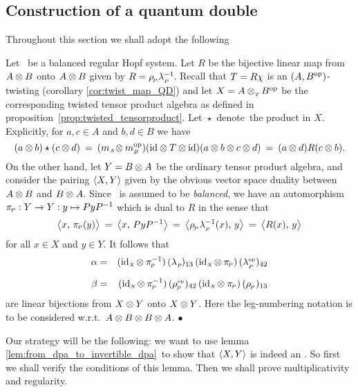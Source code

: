 
\subsection{Construction of a quantum double}
\label{par:construction_qdouble}

Throughout this section we shall adopt the following

\begin{setting}\label{setting:qdouble} \rm
Let \pairAB\ be a balanced regular Hopf system.
Let $R$ be the bijective linear map from $A \otimes B$ onto $A \otimes B$
given by \mbox{$R=\rho_{_{\!P}}\lambda_{_P\!}^{-1}\!$}\@.
Recall that $T=R\chi$ is an $(A,B^{\rm op})$-twisting (corollary \ref{cor:twist_map_QD})
and let $X=A \otimes_{_T\!} B^{\rm op}$ be the corresponding twisted tensor product algebra
as defined in \mbox{proposition \ref{prop:twisted_tensorproduct}}\@.
\mbox{Let $\star$ denote}\ the product in $X$.
Explicitly, for $a,c \in A$ and $b,d \in B$ we have
$$ (a \otimes b) \star (c \otimes d)
     \:=\: (m_{\scriptscriptstyle A} \! \otimes  m_{\scriptscriptstyle B}^{\rm op})(\mbox{\rm id} \otimes T \otimes \mbox{\rm id}) (a \otimes b \otimes c \otimes d)
     \:=\: (a\otimes d)R(c \otimes b).  $$
On the other hand, let $Y=B\otimes A$ be the ordinary tensor product algebra,
and consider the pairing $\langle X,Y \rangle$ given by the obvious vector space
duality between $A \otimes B$ and $B \otimes A$.
Since \pairAB\ is assumed to be {\em balanced}, we have an auto\-morphism
$\pi_{\scriptscriptstyle \! P}: Y  \rightarrow Y : y \mapsto P y P^{-1}$ which is dual to $R$ in the sense that
$$\pairM{x}{\piP(y)}
    \:=\:  \pairM{x}{P y P^{-1}}
    \:=\:  \pairM{\rp\lp^{-1}(x)}{y}
    \:=\:  \pairM{R(x)}{y}$$
for all $x \in X$ and $y \in Y$. It follows that
\begin{eqnarray}
\alpha &=& (\idX \tens \piP^{-1}) \, (\lp)_{13} \, (\idX \tens \piP) \, (\lpop)_{42}
\label{eq:QD:alpha} \\
\beta  &=& (\idX \tens \piP^{-1}) \, (\rpop)_{42} \, (\idX \tens \piP) \,  (\rp)_{13}
\vertXL
\label{eq:QD:beta}
\end{eqnarray}
are linear bijections from $X\otimes Y$ onto $X\otimes Y$.
Here the leg-numbering notation is to be considered w.r.t.\ $A \otimes B \otimes B \otimes A$.
\hfill $\bullet$
\end{setting}


Our strategy will be the following: we want to use lemma \ref{lem:from_dpa_to_invertible_dpa}\
to show that $\langle X,Y \rangle$ is indeed an \idpa\@. So first we shall verify the
conditions of this lemma. Then we shall prove multiplicativity and regularity.
\vspace{2ex}

